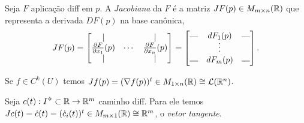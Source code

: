 

\begin{definition}
    Seja \(F\) aplicação diff em \(p\). A \emph{Jacobiana} da \(F\) é a matriz \(JF(p) \in M_{m\times n }(\mathbb{R})\) que representa a derivada \(DF(p)\) na base canônica, 
    \[\textstyle JF(p) = \begin{bmatrix}
        | &  & | \\ 
        \frac{\partial F}{\partial x_1}(p) & \cdots & \frac{\partial F}{\partial x_n}(p)\\
        | &  & | 
        \end{bmatrix} = \begin{bmatrix}
        \rotatebox{90}{$|$} & dF_1(p) & \rotatebox{90}{$|$}\\
         & \rotatebox{90}{$\cdots$} & \\
        \rotatebox{90}{$|$} & dF_m(p) & \rotatebox{90}{$|$}
        \end{bmatrix}.\]
    
\end{definition}

\begin{example}
    Se \(f\in C^k(U)\) temos \(Jf(p) = (\nabla f(p))^t \in M_{1\times n} (\mathbb{R}) \cong \mathcal{L}(\mathbb{R}^n)\).  
\end{example}
\begin{example}
    Seja \(c(t) :\I\ab \subset \R \to \R^m\) caminho diff. Para ele temos \(Jc(t) = \dot{c}(t) = (\dot{c}_i(t))^t \in M_{m\times 1}(\mathbb{R})\cong \mathbb{R}^m\), o \emph{vetor tangente}. 
\end{example}

